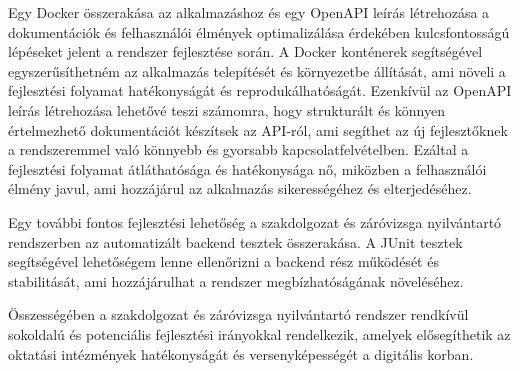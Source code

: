 Egy Docker összerakása az alkalmazáshoz és egy OpenAPI leírás létrehozása a dokumentációk és felhasználói élmények optimalizálása érdekében kulcsfontosságú lépéseket jelent a rendszer fejlesztése során. A Docker konténerek segítségével egyszerűsíthetném az alkalmazás telepítését és környezetbe állítását, ami növeli a fejlesztési folyamat hatékonyságát és reprodukálhatóságát. Ezenkívül az OpenAPI leírás létrehozása lehetővé teszi számomra, hogy strukturált és könnyen értelmezhető dokumentációt készítsek az API-ról, ami segíthet az új fejlesztőknek a rendszeremmel való könnyebb és gyorsabb kapcsolatfelvételben. Ezáltal a fejlesztési folyamat átláthatósága és hatékonysága nő, miközben a felhasználói élmény javul, ami hozzájárul az alkalmazás sikerességéhez és elterjedéséhez.

Egy további fontos fejlesztési lehetőség a szakdolgozat és záróvizsga nyilvántartó rendszerben az automatizált backend tesztek összerakása. A JUnit tesztek segítségével lehetőségem lenne ellenőrizni a backend rész működését és stabilitását, ami hozzájárulhat a rendszer megbízhatóságának növeléséhez. 

Összességében a szakdolgozat és záróvizsga nyilvántartó rendszer rendkívül sokoldalú és potenciális fejlesztési irányokkal rendelkezik, amelyek elősegíthetik az oktatási intézmények hatékonyságát és versenyképességét a digitális korban.